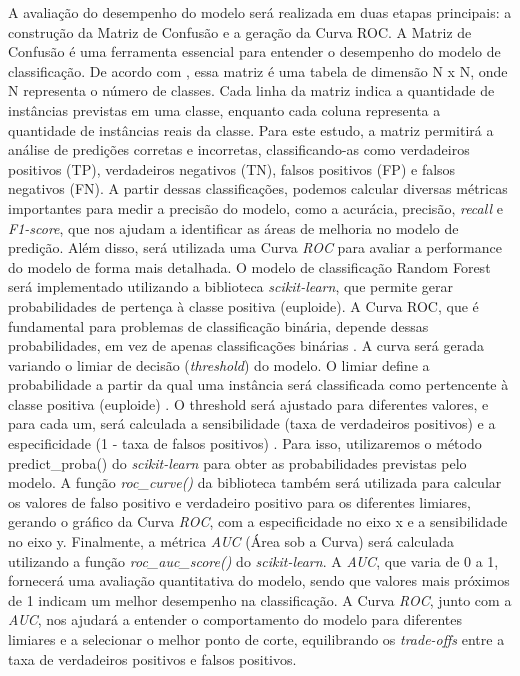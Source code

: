 A avaliação do desempenho do modelo será realizada em duas etapas principais: a construção da Matriz de Confusão e a geração da Curva ROC. A Matriz de Confusão é uma ferramenta essencial para entender o desempenho do modelo de classificação. De acordo com , essa matriz é uma tabela de dimensão N x N, onde N representa o número de classes. Cada linha da matriz indica a quantidade de instâncias previstas em uma classe, enquanto cada coluna representa a quantidade de instâncias reais da classe. Para este estudo, a matriz permitirá a análise de predições corretas e incorretas, classificando-as como verdadeiros positivos (TP), verdadeiros negativos (TN), falsos positivos (FP) e falsos negativos (FN). A partir dessas classificações, podemos calcular diversas métricas importantes para medir a precisão do modelo, como a acurácia, precisão, \textit{recall} e \textit{F1-score}, que nos ajudam a identificar as áreas de melhoria no modelo de predição. Além disso, será utilizada uma Curva \textit{ROC} para avaliar a performance do modelo de forma mais detalhada. O modelo de classificação Random Forest será implementado utilizando a biblioteca \textit{scikit-learn}, que permite gerar probabilidades de pertença à classe positiva (euploide). A Curva ROC, que é fundamental para problemas de classificação binária, depende dessas probabilidades, em vez de apenas classificações binárias \cite{vilela2022}. A curva será gerada variando o limiar de decisão (\textit{threshold}) do modelo. O limiar define a probabilidade a partir da qual uma instância será classificada como pertencente à classe positiva (euploide) \cite{vilela2022}. O threshold será ajustado para diferentes valores, e para cada um, será calculada a sensibilidade (taxa de verdadeiros positivos) e a especificidade (1 - taxa de falsos positivos) \cite{vilela2022}. Para isso, utilizaremos o método predict\_proba() do \textit{scikit-learn} para obter as probabilidades previstas pelo modelo. A função \textit{roc\_curve()} da biblioteca também será utilizada para calcular os valores de falso positivo e verdadeiro positivo para os diferentes limiares, gerando o gráfico da Curva \textit{ROC}, com a especificidade no eixo x e a sensibilidade no eixo y. Finalmente, a métrica \textit{AUC} (Área sob a Curva) será calculada utilizando a função \textit{roc\_auc\_score()} do \textit{scikit-learn}. A \textit{AUC}, que varia de 0 a 1, fornecerá uma avaliação quantitativa do modelo, sendo que valores mais próximos de 1 indicam um melhor desempenho na classificação. A Curva \textit{ROC}, junto com a \textit{AUC}, nos ajudará a entender o comportamento do modelo para diferentes limiares e a selecionar o melhor ponto de corte, equilibrando os \textit{trade-offs} entre a taxa de verdadeiros positivos e falsos positivos.

